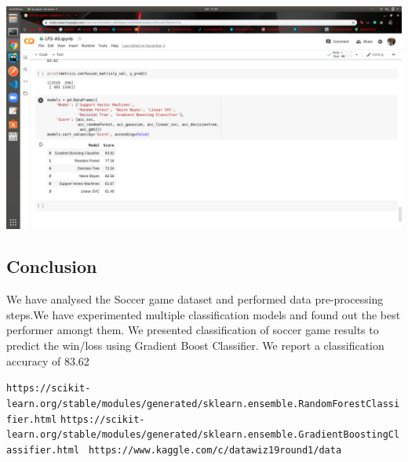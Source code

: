 \documentclass[a4paper, 12pt]{article}
\begin{document}
\begin{center}
    \includegraphics[width=\linewidth]{Comparison.png}
\end{center}
\newpage
\begin{center}
\section{Conclusion}
\end{center}
We have analysed the Soccer game dataset and performed data pre-processing steps.We have experimented multiple classification models and found out the best performer amongt them. 
We presented classification of soccer game results to predict the win/loss using Gradient Boost Classifier. We report a classification accuracy of 83.62%
\newpage
\begin{thebibliography}{1}
    \texttt{https://scikit-learn.org/stable/modules/generated/sklearn.ensemble.RandomForestClassifier.html}
    \texttt{https://scikit-learn.org/stable/modules/generated/sklearn.ensemble.GradientBoostingClassifier.html}
    \texttt{ https://www.kaggle.com/c/datawiz19round1/data}
   
\end{thebibliography}
\end{document}
